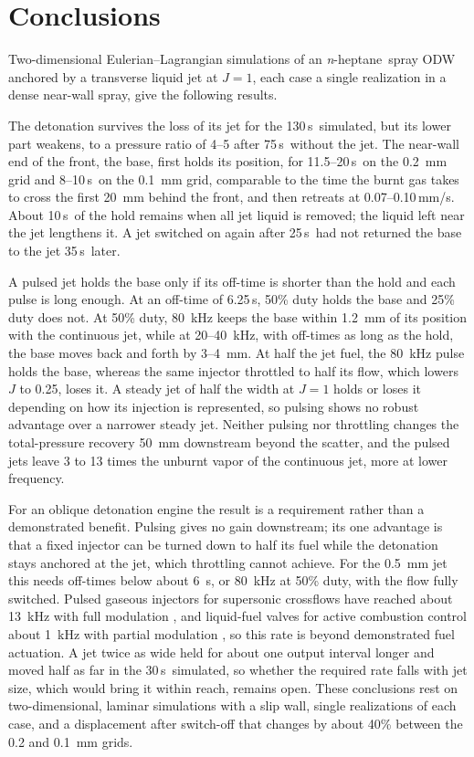 \documentclass[aip,pof,preprint,amsmath,amssymb]{revtex4-2}
\newcommand{\us}{\,\textmu s}
\newcommand{\mmus}{\,mm/\textmu s}
\newcommand{\nh}{\textit{n}-heptane}
\begin{document}
\section{Conclusions}\label{sec:conclusions}

Two-dimensional Eulerian--Lagrangian simulations of an \nh\ spray ODW anchored by a transverse liquid jet at $J = 1$, each case a single realization in a dense near-wall spray, give the following results.

The detonation survives the loss of its jet for the 130\us\ simulated, but its lower part weakens, to a pressure ratio of 4--5 after 75\us\ without the jet. The near-wall end of the front, the base, first holds its position, for 11.5--20\us\ on the 0.2~mm grid and 8--10\us\ on the 0.1~mm grid, comparable to the time the burnt gas takes to cross the first 20~mm behind the front, and then retreats at 0.07--0.10\mmus. About 10\us\ of the hold remains when all jet liquid is removed; the liquid left near the jet lengthens it. A jet switched on again after 25\us\ had not returned the base to the jet 35\us\ later.

A pulsed jet holds the base only if its off-time is shorter than the hold and each pulse is long enough. At an off-time of 6.25\us, 50\% duty holds the base and 25\% duty does not. At 50\% duty, 80~kHz keeps the base within 1.2~mm of its position with the continuous jet, while at 20--40~kHz, with off-times as long as the hold, the base moves back and forth by 3--4~mm. At half the jet fuel, the 80~kHz pulse holds the base, whereas the same injector throttled to half its flow, which lowers $J$ to 0.25, loses it. A steady jet of half the width at $J = 1$ holds or loses it depending on how its injection is represented, so pulsing shows no robust advantage over a narrower steady jet. Neither pulsing nor throttling changes the total-pressure recovery 50~mm downstream beyond the scatter, and the pulsed jets leave 3 to 13 times the unburnt vapor of the continuous jet, more at lower frequency.

For an oblique detonation engine the result is a requirement rather than a demonstrated benefit. Pulsing gives no gain downstream; its one advantage is that a fixed injector can be turned down to half its fuel while the detonation stays anchored at the jet, which throttling cannot achieve. For the 0.5~mm jet this needs off-times below about 6~\textmu s, or 80~kHz at 50\% duty, with the flow fully switched. Pulsed gaseous injectors for supersonic crossflows have reached about 13~kHz with full modulation \cite{Cutler2001}, and liquid-fuel valves for active combustion control about 1~kHz with partial modulation \cite{Lovett2008}, so this rate is beyond demonstrated fuel actuation. A jet twice as wide held for about one output interval longer and moved half as far in the 30\us\ simulated, so whether the required rate falls with jet size, which would bring it within reach, remains open. These conclusions rest on two-dimensional, laminar simulations with a slip wall, single realizations of each case, and a displacement after switch-off that changes by about 40\% between the 0.2 and 0.1~mm grids.
\end{document}
